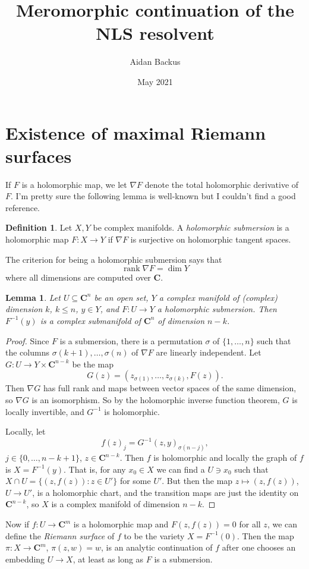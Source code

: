 \documentclass[reqno,12pt,letterpaper]{amsart}
\title[Meromorphic continuation of the NLS resolvent]{Meromorphic continuation of the NLS resolvent}
\author{Aidan Backus}
\date{May 2021}
\newcommand{\CC}{\mathbf{C}}
\DeclareMathOperator{\rank}{rank}
\newcommand{\dfn}[1]{\emph{#1}\index{#1}}
\newtheorem{lemma}[theorem]{Lemma}
\theoremstyle{definition}
\newtheorem{definition}[theorem]{Definition}
\begin{document}
\begin{abstract}
\end{abstract}

\maketitle


\section{Existence of maximal Riemann surfaces}

If $F$ is a holomorphic map, we let $\nabla F$ denote the total holomorphic derivative of $F$.
I'm pretty sure the following lemma is well-known but I couldn't find a good reference.
\begin{definition}
Let $X,Y$ be complex manifolds.
A \dfn{holomorphic submersion} is a holomorphic map $F: X \to Y$ if $\nabla F$ is surjective on holomorphic tangent spaces.
\end{definition}
The criterion for being a holomorphic submersion says that
$$\rank \nabla F = \dim Y$$
where all dimensions are computed over $\CC$.
\begin{lemma}
Let $U \subseteq \CC^n$ be an open set, $Y$ a complex manifold of (complex) dimension $k$, $k \leq n$, $y \in Y$, and $F: U \to Y$ a holomorphic submersion.
Then $F^{-1}(y)$ is a complex submanifold of $\CC^n$ of dimension $n - k$.
\end{lemma}
\begin{proof}
Since $F$ is a submersion, there is a permutation $\sigma$ of $\{1, \dots, n\}$ such that the columns $\sigma(k+1), \dots, \sigma(n)$ of $\nabla F$ are linearly independent.
Let $G: U \to Y \times \CC^{n - k}$ be the map
$$G(z) = (z_{\sigma(1)}, \dots, z_{\sigma(k)}, F(z)).$$
Then $\nabla G$ has full rank and maps between vector spaces of the same dimension, so $\nabla G$ is an isomorphism.
So by the holomorphic inverse function theorem, $G$ is locally invertible, and $G^{-1}$ is holomorphic.

Locally, let
$$f(z)_j = G^{-1}(z, y)_{\sigma(n-j)},$$
$j \in \{0, \dots, n - k + 1\}$, $z \in \CC^{n - k}$.
Then $f$ is holomorphic and locally the graph of $f$ is $X = F^{-1}(y)$.
That is, for any $x_0 \in X$ we can find a $U \ni x_0$ such that $X \cap U = \{(z, f(z)): z \in U'\}$ for some $U'$.
But then the map $z \mapsto (z, f(z))$, $U \to U'$, is a holomorphic chart, and the transition maps are just the identity on $\CC^{n-k}$, so $X$ is a complex manifold of dimension $n - k$.
\end{proof}
Now if $f: U \to \CC^m$ is a holomorphic map and $F(z, f(z)) = 0$ for all $z$, we can define the \emph{Riemann surface} of $f$ to be the variety $X = F^{-1}(0)$. Then the map $\pi: X \to \CC^m$, $\pi(z, w) = w$, is an analytic continuation of $f$ after one chooses an embedding $U \to X$, at least as long as $F$ is a submersion.
\end{document}
